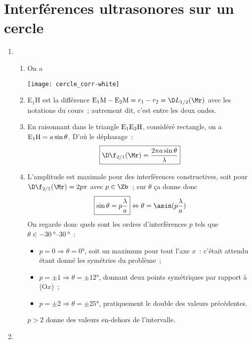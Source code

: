 \documentclass[a4paper, 12pt, final, garamond]{book}
\begin{document}
\section{Interférences ultrasonores sur un cercle}
\begin{enumerate}
    \item 
    \begin{enumerate}
        \item On a
            \begin{center}
                \texttt{[image: cercle\_corr-white]}
            \end{center}
        \item E$_1$H est la différence ${\rm E_1M - E_2M} = r_1-r_2 = \D
            L_{1/2}(\Mr)$ avec les notations du cours~; autrement dit, c'est
             entre les deux ondes.
        \item En raisonnant dans le triangle $\rm E_1E_2H$, considéré rectangle, on
            a ${\rm E_1H} = a \sin\theta$. D'où le déphasage~:
            \[\boxed{\D\f_{2/1}(\Mr) = \frac{2\pi a\sin\theta}{\lambda}}\]
        \item L'amplitude est maximale pour des interférences constructives, soit
            pour $\D\f_{2/1}(\Mr) = 2p\pi$ avec $p\in\Zb$~; sur $\theta$ ça donne
            donc
            \[
                \boxed{\sin\theta = p \frac{\lambda}{a}}
                \Leftrightarrow
                \theta = \asin(p \frac{\lambda}{a})
            \]
            On regarde donc quels sont les ordres d'interférences $p$ tels que
            $\theta \in \SIrange{-30}{30}{\degree}$~:
            \begin{itemize}
                \item $p=0 \Rightarrow \theta = \ang{0;;}$, soit un maximum
                    pour tout l'axe $x$~: c'était attendu étant donné les symétries
                    du problème~;
                \item $p = \pm 1 \Rightarrow \theta = \pm\ang{12;;}$, donnant deux
                    points symétriques par rapport à (O$x$)~;
                \item $p = \pm 2 \Rightarrow \theta = \pm\ang{25;;}$, pratiquement
                    le double des valeurs précédentes.
            \end{itemize}
            $p > 2$ donne des valeurs en-dehors de l'intervalle.
    \end{enumerate}
    \item
        \begin{enumerate}

\end{enumerate}
\end{enumerate}
\end{document}

